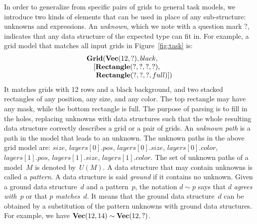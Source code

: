 \documentclass[a4paper]{llncs}
\begin{document}
In order to generalize from specific pairs of grids to general task
models, we introduce two kinds of elements that can be used in place
of any sub-structure: unknowns and expressions.
%
An {\em unknown}, which we note with a question mark $?$, indicates
that any data structure of the expected type can fit in. For example,
a grid model that matches all input grids in Figure~\ref{fig:task} is:
\[\begin{array}{l}
    {\bf Grid}({\bf Vec}(12,?), black,\\
    \quad [{\bf Rectangle}(?, ?, ?, ?),\\
    \quad ~{\bf Rectangle}(?, ?, ?, full)])
  \end{array}\]
%
It matches grids with 12 rows and a black background, and two stacked
rectangles of any position, any size, and any color. The top rectangle
may have any mask, while the bottom rectangle is full. The purpose of
parsing is to fill in the holes, replacing unknowns with data
structures such that the whole resulting data structure correctly
describes a grid or a pair of grids.
%
An {\em unknown path} is a path in the model that leads to an
unknown. The unknown paths in the above grid model are: $size$,
$layers[0].pos$, $layers[0].size$, $layers[0].color$, $layers[1].pos$,
$layers[1].size$, $layers[1].color$. The set of unknown paths of a
model~$M$ is denoted by~$U(M)$.
%
A data structure that may contain unknowns is called a {\em
  pattern}. A data structure is said {\em ground} if it contains no
unknown. Given a ground data structure~$d$ and a pattern~$p$, the
notation $d \sim p$ says that $d$ {\em agrees with}~$p$ or that $p$
{\em matches}~$d$. It means that the ground data structure~$d$ can be
obtained by a substitution of the pattern unknowns with ground data
structures. For example, we have
${\bf Vec}(12,14) \sim {\bf Vec}(12,?)$.
\end{document}
